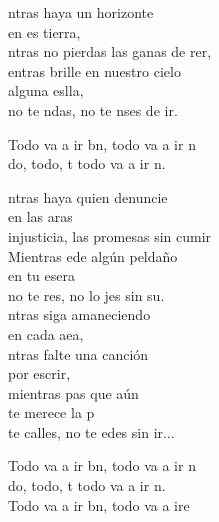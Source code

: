 \begin{cancion}%
	ntras haya un horizonte \\
	en es tierra,\\
	ntras no pierdas las ganas de rer,\\
	entras brille en nuestro cielo\\
	alguna eslla,\\
	no te ndas, no te nses de ir.\jump\\
	\begin{chorus}%
		Todo va a ir bn, todo va a ir n\\
		do, todo, t todo va a ir n.\jump\\
	\end{chorus}%
	ntras haya quien denuncie \\
	en las aras\\
	injusticia, las promesas sin cumir\\
	Mientras ede algún peldaño \\
	en tu esera\\
	no te res, no lo jes sin su.\\
	\jump
	ntras siga amaneciendo\\
	en cada aea,\\
	ntras falte una canción\\
	por escrir,\\
	mientras pas que aún\\
	te merece la p\\
	 te calles, no te edes sin ir...\jump\\
	\begin{chorus}%
		Todo va a ir bn, todo va a ir n\chord{Re}{}{. }\\
		do, todo, t todo va a ir \chord{Sol}{}{bie}n.\\
		Todo va a ir bn, todo va a ire\chord{(Re}{)}{n.  }\\

\end{chorus}
\end{cancion}
